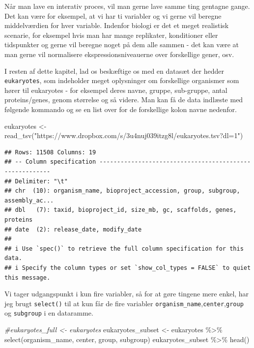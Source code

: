 \documentclass[
]{book}
\newenvironment{Shaded}{\begin{snugshade}}{\end{snugshade}}
\newcommand{\CommentTok}[1]{\textcolor[rgb]{0.56,0.35,0.01}{\textit{#1}}}
\newcommand{\FunctionTok}[1]{\textcolor[rgb]{0.00,0.00,0.00}{#1}}
\newcommand{\NormalTok}[1]{#1}
\newcommand{\OtherTok}[1]{\textcolor[rgb]{0.56,0.35,0.01}{#1}}
\newcommand{\SpecialCharTok}[1]{\textcolor[rgb]{0.00,0.00,0.00}{#1}}
\newcommand{\StringTok}[1]{\textcolor[rgb]{0.31,0.60,0.02}{#1}}
\begin{document}
Når man lave en interativ proces, vil man gerne lave samme ting gentagne gange. Det kan være for eksempel, at vi har ti variabler og vi gerne vil beregne middelværdien for hver variable. Indenfor biologi er det et meget realistisk scenarie, for eksempel hvis man har mange replikater, konditioner eller tidspunkter og gerne vil beregne noget på dem alle sammen - det kan være at man gerne vil normalisere ekspressionsniveauerne over forskellige gener, osv.

I resten af dette kapitel, lad os beskæftige os med en datasæt der hedder \texttt{eukaryotes}, som indeholder meget oplysninger om forskellige organismer som hører til eukaryotes - for eksempel deres navne, gruppe, sub-gruppe, antal proteins/genes, genom størrelse og så videre. Man kan få de data indlæste med følgende kommando og se en list over for de forskellige kolon navne nedenfor.

\begin{Shaded}
\begin{Highlighting}[]
\NormalTok{eukaryotes }\OtherTok{\textless{}{-}} \FunctionTok{read\_tsv}\NormalTok{(}\StringTok{"https://www.dropbox.com/s/3u4nuj039itzg8l/eukaryotes.tsv?dl=1"}\NormalTok{)}
\end{Highlighting}
\end{Shaded}

\begin{verbatim}
## Rows: 11508 Columns: 19
## -- Column specification --------------------------------------------------------
## Delimiter: "\t"
## chr  (10): organism_name, bioproject_accession, group, subgroup, assembly_ac...
## dbl   (7): taxid, bioproject_id, size_mb, gc, scaffolds, genes, proteins
## date  (2): release_date, modify_date
## 
## i Use `spec()` to retrieve the full column specification for this data.
## i Specify the column types or set `show_col_types = FALSE` to quiet this message.
\end{verbatim}

Vi tager udgangspunkt i kun fire variabler, så for at gøre tingene mere enkel, har jeg brugt \texttt{select()} til at kun får de fire variabler \texttt{organism\_name},\texttt{center},\texttt{group} og \texttt{subgroup} i en dataramme.

\begin{Shaded}
\begin{Highlighting}[]
\CommentTok{\#eukaryotes\_full \textless{}{-} eukaryotes}
\NormalTok{eukaryotes\_subset }\OtherTok{\textless{}{-}}\NormalTok{ eukaryotes }\SpecialCharTok{\%\textgreater{}\%} \FunctionTok{select}\NormalTok{(organism\_name, center, group, subgroup)}
\NormalTok{eukaryotes\_subset }\SpecialCharTok{\%\textgreater{}\%} \FunctionTok{head}\NormalTok{()}
\end{Highlighting}
\end{Shaded}
\end{document}
